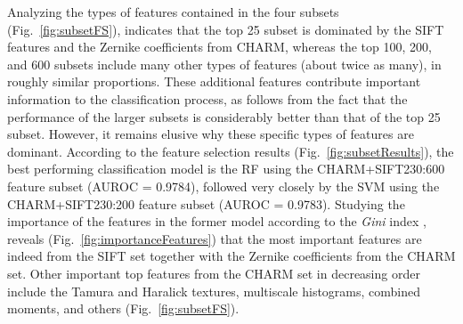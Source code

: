 Analyzing the types of features contained in the four subsets (Fig.~\ref{fig:subsetFS}), indicates that the top 25 subset is dominated by the SIFT features and the Zernike coefficients from CHARM, whereas the top 100, 200, and 600 subsets include many other types of features (about twice as many), in roughly similar proportions. These additional features contribute important information to the classification process, as follows from the fact that the performance of the larger subsets is considerably better than that of the top 25 subset. However, it remains elusive why these specific types of features are dominant. According to the feature selection results (Fig.~\ref{fig:subsetResults}), the best performing classification model is the RF using the CHARM+SIFT230:600 feature subset (AUROC = 0.9784), followed very closely by the SVM using the CHARM+SIFT230:200 feature subset (AUROC = 0.9783). Studying the importance of the features in the former model according to the \textit{Gini} index \cite{breiman2001random}, reveals (Fig.~\ref{fig:importanceFeatures}) that the most important features are indeed from the SIFT set together with the Zernike coefficients from the CHARM set. Other important top features from the CHARM set in decreasing order include the Tamura and Haralick textures, multiscale histograms, combined moments, and others (Fig.~\ref{fig:subsetFS}).
